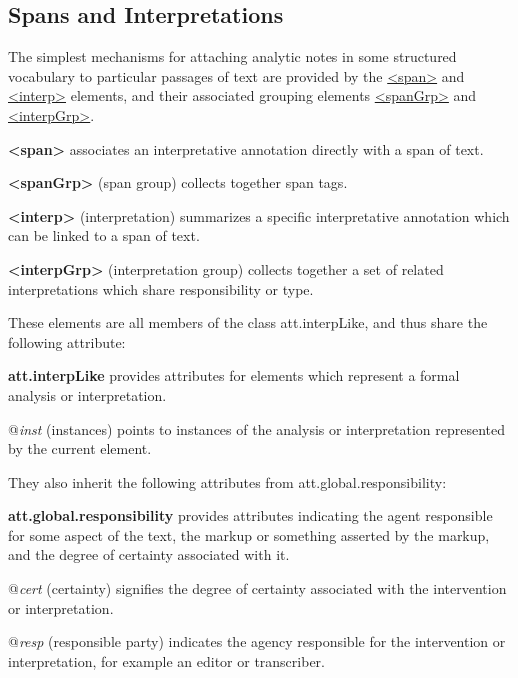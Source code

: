 \subsection[{Spans and Interpretations}]{Spans and Interpretations}\label{AISP}\par
The simplest mechanisms for attaching analytic notes in some structured vocabulary to particular passages of text are provided by the \hyperref[TEI.span]{<span>} and \hyperref[TEI.interp]{<interp>} elements, and their associated grouping elements \hyperref[TEI.spanGrp]{<spanGrp>} and \hyperref[TEI.interpGrp]{<interpGrp>}. 
\begin{sansreflist}
  
\item [\textbf{<span>}] associates an interpretative annotation directly with a span of text.
\item [\textbf{<spanGrp>}] (span group) collects together span tags.
\item [\textbf{<interp>}] (interpretation) summarizes a specific interpretative annotation which can be linked to a span of text.
\item [\textbf{<interpGrp>}] (interpretation group) collects together a set of related interpretations which share responsibility or type.
\end{sansreflist}
\par
These elements are all members of the class \textsf{att.interpLike}, and thus share the following attribute: 
\begin{sansreflist}
  
\item [\textbf{att.interpLike}] provides attributes for elements which represent a formal analysis or interpretation.\hfil\\[-10pt]\begin{sansreflist}
    \item[@{\itshape inst}]
  (instances) points to instances of the analysis or interpretation represented by the current element.
\end{sansreflist}  
\end{sansreflist}
 They also inherit the following attributes from \textsf{att.global.responsibility}: 
\begin{sansreflist}
  
\item [\textbf{att.global.responsibility}] provides attributes indicating the agent responsible for some aspect of the text, the markup or something asserted by the markup, and the degree of certainty associated with it.\hfil\\[-10pt]\begin{sansreflist}
    \item[@{\itshape cert}]
  (certainty) signifies the degree of certainty associated with the intervention or interpretation.
    \item[@{\itshape resp}]
  (responsible party) indicates the agency responsible for the intervention or interpretation, for example an editor or transcriber.
\end{sansreflist}  
\end{sansreflist}
